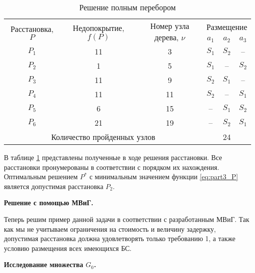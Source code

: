 
\begin{longtable}[c]{| c | c | c | c  c c|}
    \caption{Решение полным перебором}\label{part4:brute_force_solution}\\

    \hline
    \multirow{2}{*}{Расстановка, $P$} & \multirow{2}{*}{Недопокрытие, $f(P)$} & \multirow{2}{*}{Номер узла дерева, $\nu$} &  \multicolumn{3}{c|}{Размещение} \\\cline{4-6}

    &&& $a_1$&	$a_2$&	$a_3$\\
    \hline
    $P_1$ & 11 & 3 & $S_1$ & $S_2$ & -- \\
    $P_2$ & 1 & 5 & $S_1$ & -- & $S_2$ \\
    $P_3$ & 11 & 9 & $S_2$ & $S_1$ & --  \\
    $P_4$ & 11 & 11 & $S_2$ & -- & $S_1$ \\
    $P_5$ & 6 & 15 & -- & $S_1$  & $S_2$\\
    $P_6$ & 21 & 19 & -- & $S_2$  & $S_1$\\
    \hline
    \multicolumn{3}{|c|}{Количество пройденных узлов} & \multicolumn{3}{|c|}{24} \\

    \hline
\end{longtable}


В таблице \cref{part4:brute_force_solution} представлены полученные в ходе решения расстановки. Все расстановки пронумерованы в соответствии с порядком их нахождения. Оптимальным решением $P^*$ с минимальным значением функции \cref{eq:part3_P} является допустимая расстановка $P_2$.


\textbf{Решение с помощью МВиГ.}

Теперь решим пример данной задачи в соответствии с разработанным МВиГ. Так как мы не учитываем ограничения на стоимость и величину задержку, допустимая расстановка должна удовлетворять только требованию 1, а также условию размещения всех имеющихся БС.



\textbf{Исследование множества $G_0$.}

